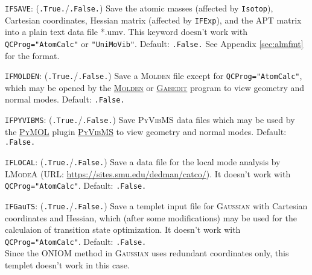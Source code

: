 \documentclass[12pt,english]{extarticle}
\begin{document}
\bigskip{}\bigskip{}
\verb|IFSAVE|: (\verb|.True.|/\verb|.False.|) Save the atomic masses (affected by
\verb|Isotop|), Cartesian coordinates, Hessian matrix (affected by
\verb|IFExp|), and the APT matrix into a plain text data file *.umv. This keyword
doesn't work with \verb|QCProg="AtomCalc"| or \verb|"UniMoVib"|. Default: \verb|.False.| See Appendix \ref{sec:almfmt} for the format.

\bigskip{}\bigskip{}
\verb|IFMOLDEN|: (\verb|.True.|/\verb|.False.|) Save a \textsc{Molden} file except for \verb|QCProg="AtomCalc"|, which may be opened by the \href{https://www3.cmbi.umcn.nl/molden/}{\textsc{Molden}} or \href{http://gabedit.sourceforge.net/}{\textsc{Gabedit}} program to view geometry and normal modes. Default: \verb|.False.|

\bigskip{}\bigskip{}
\verb|IFPYVIBMS|: (\verb|.True.|/\verb|.False.|) Save \textsc{PyVibMS} data files which may be used by the \href{https://pymol.org/}{\textsc{PyMOL}} plugin \href{https://github.com/smutao/PyVibMS}{\textsc{PyVibMS}} to view geometry and normal modes. Default: \verb|.False.|

\bigskip{}\bigskip{}
\verb|IFLOCAL|: (\verb|.True.|/\verb|.False.|) Save a data file for the local mode analysis by \textsc{LModeA} (URL: \href{https://sites.smu.edu/dedman/catco/}{https://sites.smu.edu/dedman/catco/}). It doesn't work with \verb|QCProg="AtomCalc"|. Default: \verb|.False.|

\bigskip{}\bigskip{}
\verb|IFGauTS|: (\verb|.True.|/\verb|.False.|) Save a templet input file for \textsc{Gaussian} with Cartesian coordinates and Hessian, which (after some modifications) may be used for the calculaion of transition state optimization. It doesn't work with \verb|QCProg="AtomCalc"|. Default: \verb|.False.| \\
Since the ONIOM method in \textsc{Gaussian} uses redundant coordinates only, this templet doesn't work in this case.
\end{document}

